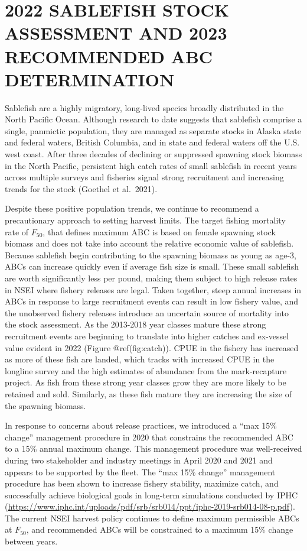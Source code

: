 \documentclass[
]{article}
\begin{document}
\hypertarget{sablefish-stock-assessment-and-2023-recommended-abc-determination}{%
\section{2022 SABLEFISH STOCK ASSESSMENT AND 2023 RECOMMENDED ABC
DETERMINATION}\label{sablefish-stock-assessment-and-2023-recommended-abc-determination}}

Sablefish are a highly migratory, long-lived species broadly distributed
in the North Pacific Ocean. Although research to date suggests that
sablefish comprise a single, panmictic population, they are managed as
separate stocks in Alaska state and federal waters, British Columbia,
and in state and federal waters off the U.S. west coast. After three
decades of declining or suppressed spawning stock biomass in the North
Pacific, persistent high catch rates of small sablefish in recent years
across multiple surveys and fisheries signal strong recruitment and
increasing trends for the stock (Goethel et al.~2021).

Despite these positive population trends, we continue to recommend a
precautionary approach to setting harvest limits. The target fishing
mortality rate of \(F_{50}\), that defines maximum ABC is based on
female spawning stock biomass and does not take into account the
relative economic value of sablefish. Because sablefish begin
contributing to the spawning biomass as young as age-3, ABCs can
increase quickly even if average fish size is small. These small
sablefish are worth significantly less per pound, making them subject to
high release rates in NSEI where fishery releases are legal. Taken
together, steep annual increases in ABCs in response to large
recruitment events can result in low fishery value, and the unobserved
fishery releases introduce an uncertain source of mortality into the
stock assessment. As the 2013-2018 year classes mature these strong
recruitment events are beginning to translate into higher catches and
ex-vessel value evident in 2022 (Figure @ref(fig:catch)). CPUE in the
fishery has increased as more of these fish are landed, which tracks
with increased CPUE in the longline survey and the high estimates of
abundance from the mark-recapture project. As fish from these strong
year classes grow they are more likely to be retained and sold.
Similarly, as these fish mature they are increasing the size of the
spawning biomass.

In response to concerns about release practices, we introduced a ``max
15\% change'' management procedure in 2020 that constrains the
recommended ABC to a 15\% annual maximum change. This management
procedure was well-received during two stakeholder and industry meetings
in April 2020 and 2021 and appears to be supported by the fleet. The
``max 15\% change'' management procedure has been shown to increase
fishery stability, maximize catch, and successfully achieve biological
goals in long-term simulations conducted by IPHC
(\url{https://www.iphc.int/uploads/pdf/srb/srb014/ppt/iphc-2019-srb014-08-p.pdf}).
The current NSEI harvest policy continues to define maximum permissible
ABCs at \(F_{50}\), and recommended ABCs will be constrained to a
maximum 15\% change between years.
\end{document}
